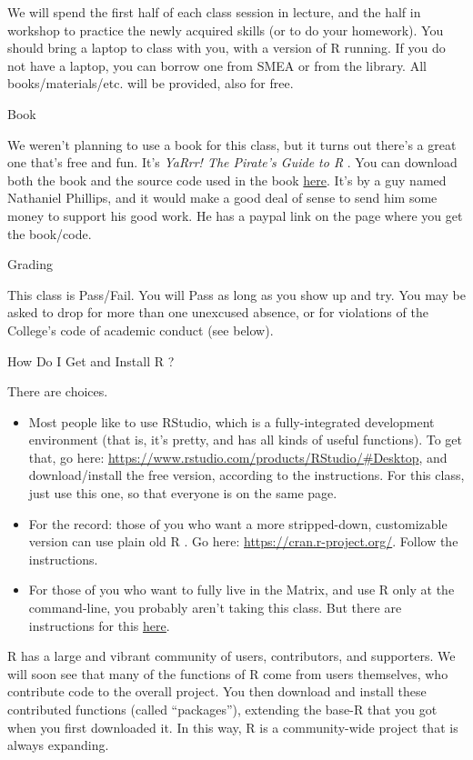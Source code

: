 \documentclass[11pt,letterpaper]{article}
\newcommand{\R}[0]{\textsf{R }}
\begin{document}
We will spend the first half of each class session in lecture, and the half in workshop to practice the newly acquired skills (or to do your homework).  You should bring a laptop to class with you, with a version of \R running. If you do not have a laptop, you can borrow one from SMEA or from the library.  All books/materials/etc. will be provided, also for free. 

{\Large Book}\hrulefill

We weren't planning to use a book for this class, but it turns out there's a great one that's free and fun.  It's \textit{YaRrr! The Pirate's Guide to \R}.  You can download both the book and the source code used in the book \href{https://ndphillips.github.io/piratesguide.html}{here}.  It's by a guy named Nathaniel Phillips, and it would make a good deal of sense to send him some money to support his good work. He has a paypal link on the page where you get the book/code. 

{\Large Grading}\hrulefill

This class is Pass/Fail. You will Pass as long as you show up and try. You may be asked to drop for more than one unexcused absence, or for violations of the College's code of academic conduct (see below).


{\Large How Do I Get and Install \R?}\hrulefill

There are choices.
\begin{itemize}
	\item  Most people like to use \textsf{RStudio}, which is a fully-integrated development environment (that is, it's pretty, and has all kinds of useful functions).  To get that, go here: \url{https://www.rstudio.com/products/RStudio/#Desktop}, and download/install the free version, according to the instructions. For this class, just use this one, so that everyone is on the same page. 
	\item For the record: those of you who want a more stripped-down, customizable version can use plain old \R. Go here: \url{https://cran.r-project.org/}. Follow the instructions. 
	\item For those of you who want to fully live in the Matrix,  and use \R only at the command-line, you probably aren't taking this class.  But there are instructions for this \href{https://cran.r-project.org/doc/manuals/r-patched/R-admin.html#Getting-and-unpacking-the-sources}{\underline{here}}.

\end{itemize}

\R has a large and vibrant community of users, contributors, and supporters. We will soon see that many of the functions of \R come from users themselves, who contribute code to the overall project. You then download and install these contributed functions (called ``packages''), extending the base-\R that you got when you first downloaded it. In this way, \R is a community-wide project that is always expanding. 
\end{document}
